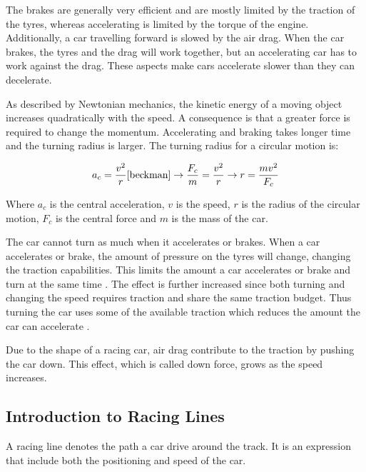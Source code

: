 The brakes are generally very efficient and are mostly limited by the traction of the tyres, whereas accelerating is limited by the torque of the engine. Additionally, a car travelling forward is slowed by the air drag. When the car brakes, the tyres and the drag will work together, but an accelerating car has to work against the drag. These aspects make cars accelerate slower than they can decelerate.

As described by Newtonian mechanics, the kinetic energy of a moving object increases quadratically with the speed. A consequence is that a greater force is required to change the momentum. Accelerating and braking takes longer time and the turning radius is larger. The turning radius for a circular motion is:

\begin{equation}
a_c = \frac{v^2}{r} \cite{beckman} 
\rightarrow
\frac{F_c}{m} = \frac{v^2}{r} 
\rightarrow
r = \frac{mv^2}{F_c}
\end{equation}

\noindent
Where $a_c$ is the central acceleration, $v$ is the speed, $r$ is the radius of the circular motion, $F_c$ is the central force and $m$ is the mass of the car.

The car cannot turn as much when it accelerates or brakes. When a car accelerates or brake, the amount of pressure on the tyres will change, changing the traction capabilities. This limits the amount a car accelerates or brake and turn at the same time \cite{beckman}. The effect is further increased since both turning and changing the speed requires traction and share the same traction budget. Thus turning the car uses some of the available traction which reduces the amount the car can accelerate \cite{beckman}. 


Due to the shape of a racing car, air drag contribute to the traction by pushing the car down. This effect, which is called down force, grows as the speed increases.

\subsection{Introduction to Racing Lines}
A racing line denotes the path a car drive around the track. It is an expression that include both the positioning and speed of the car.

